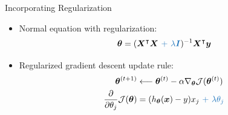 \begin{frame}{Incorporating Regularization}{}
	\begin{itemize}
		\item Normal equation with regularization:
		\begin{equation}
			\bm{\theta} = (\bm{X}^{\intercal} \bm{X}\ \textcolor{myblue1}{+\ \lambda \bm{I}})^{-1}
				\bm{X}^{\intercal} \bm{y}
		\end{equation}
		\item Regularized gradient descent update rule:
		\begin{align*}
			\bm{\theta}^{(t+1)}
				&\longleftarrow \bm{\theta}^{(t)}
					- \alpha \nabla_{\bm{\theta}}\mathcal{J}(\bm{\theta}^{(t)}) \\
			\frac{\partial}{\partial \theta_j} \mathcal{J}(\bm{\theta})
				&= (h_{\bm{\theta}}(\bm{x}) - y) x_j\ \textcolor{myblue1}{+\ \lambda \theta_j}
		\end{align*}
	\end{itemize}
\end{frame}


